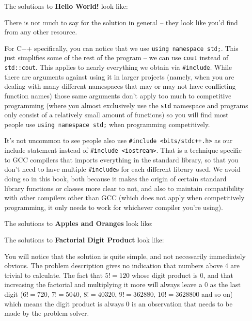 \hrulefill

The solutions to \textbf{Hello World!} look like:


There is not much to say for the solution in general -- they look like you'd find from any other resource.

For C++ specifically, you can notice that we use \texttt{using namespace std;}. This just simplifies some of the rest of the program -- we can use \texttt{cout} instead of \texttt{std::cout}. This applies to nearly everything we obtain via \texttt{#include}. While there are arguments against using it in larger projects (namely, when you are dealing with many different namespaces that may or may not have conflicting function names) those same arguments don't apply too much to competitive programming (where you almost exclusively use the \texttt{std} namespace and programs only consist of a relatively small amount of functions) so you will find most people use \texttt{using namespace std;} when programming competitively.

It's not uncommon to see people also use \texttt{#include <bits/stdc++.h>} as our include statement instead of \texttt{#include <iostream>}. That is a technique specific to GCC compilers that imports everything in the standard library, so that you don't need to have multiple \texttt{#include}s for each different library used. We avoid doing so in this book, both because it makes the origin of certain standard library functions or classes more clear to not, and also to maintain compatibility with other compilers other than GCC (which does not apply when competitively programming, it only needs to work for whichever compiler you're using).

The solutions to \textbf{Apples and Oranges} look like:


The solutions to \textbf{Factorial Digit Product} look like:


You will notice that the solution is quite simple, and not necessarily immediately obvious. The problem description gives no indication that numbers above 4 are trivial to calculate. The fact that $5! = 120$ whose digit product is $0$, and that increasing the factorial and multiplying it more will always leave a $0$ as the last digit ($6! = 720$, $7! = 5040$, $8! = 40320$, $9! = 362880$, $10! = 3628800$ and so on) which means the digit product is always $0$ is an observation that needs to be made by the problem solver.

